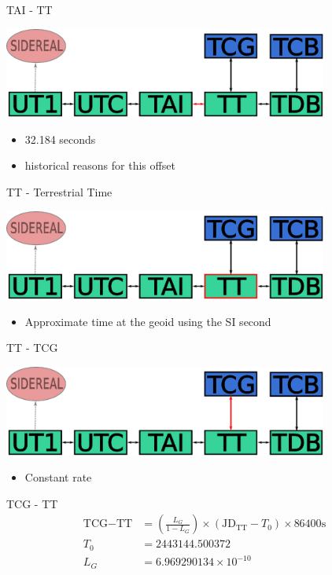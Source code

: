 \documentclass[14pt,table,t, c]{beamer}
\begin{document}
\begin{frame}{TAI - TT}
\begin{center}
	\includegraphics[width=0.8\textwidth]{figure/tai_tt}
\end{center}
\begin{itemize}
\item 32.184 seconds
\item historical reasons for this offset
\end{itemize}
\end{frame}

\begin{frame}{TT - Terrestrial Time}
\begin{center}
	\includegraphics[width=0.8\textwidth]{figure/tt}
\end{center}
\begin{itemize}
\item Approximate time at the geoid using the SI second
\end{itemize}
\end{frame}

\begin{frame}{TT - TCG}
\begin{center}
	\includegraphics[width=0.8\textwidth]{figure/tt_tcg}
\end{center}
\vspace*{-\baselineskip}
\begin{itemize}
\item Constant rate
\end{itemize}
\begin{block}{TCG - TT}
\small
\vspace*{-\baselineskip}\setlength\belowdisplayskip{0pt}\setlength\abovedisplayskip{0pt}
\begin{align*}
\text{TCG} - \text{TT} &= \left( \frac{L_G}{1 - L_G} \right) \times \left( \text{JD}_\text{TT} - T_0\right) \times 86400 \text{s}\\
T_0 &= 2443144.500372 \\
L_G &= 6.969290134 \times 10^{-10}
\end{align*}
\end{block}
\end{frame}
\end{document}
